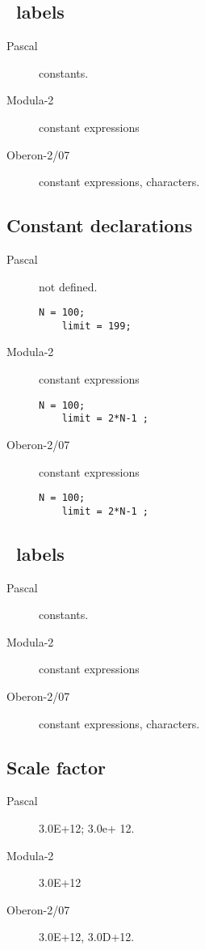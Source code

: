 \documentclass[10pt]{article}
\begin{document}
\subsection{\CASE\ labels}
\begin{description}
    \item[Pascal] constants.
    
    \item[Modula-2] constant expressions
    
    \item[Oberon-2/07] constant expressions, characters.
\end{description}

\subsection{Constant declarations}
\begin{description}
    \item[Pascal] not defined.
    \begin{lstlisting}[style=example]   
    N = 100; 
    limit = 199;   
    \end{lstlisting}
    
    \item[Modula-2] constant expressions
    \begin{lstlisting}[style=example]   
    N = 100;
    limit = 2*N-1 ;  
    \end{lstlisting}
    
    \item[Oberon-2/07] constant expressions
    \begin{lstlisting}[style=example]   
    N = 100;
    limit = 2*N-1 ;  
    \end{lstlisting}
\end{description}

\subsection{\CASE\ labels}
\begin{description}
    \item[Pascal] constants.
    
    \item[Modula-2] constant expressions
    
    \item[Oberon-2/07] constant expressions, characters.
\end{description}

\subsection{Scale factor}
\begin{description}
    \item[Pascal] 3.0E+12; 3.0e+ 12.
    
    \item[Modula-2] 3.0E+12
    
    \item[Oberon-2/07] 3.0E+12, 3.0D+12.
\end{description}
\end{document}
